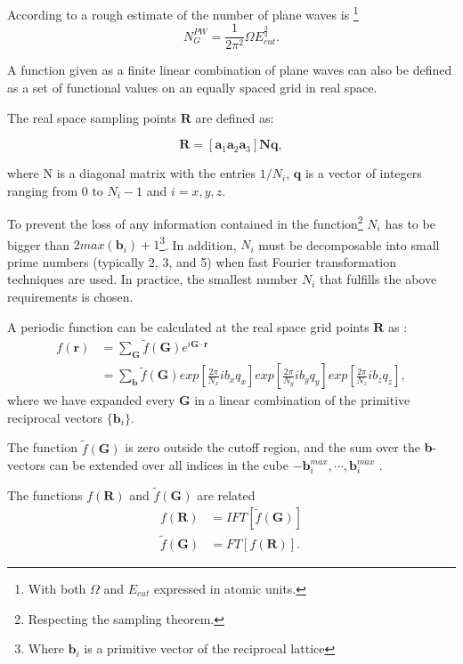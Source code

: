 \documentclass[a4paper,12pt]{article}
\newcommand\mf[1]{\mathbf{#1}}
\newcommand\erre{\mathbf{r}}
\newcommand\GI{\mathbf{G}}
\begin{document}
According to \cite[p.88]{Marx} a rough estimate of the number of plane waves is \footnote{With both $\Omega$ and $E_{cut}$ expressed in atomic units.}
\begin{equation}\label{eq:NGPW}
	N_{G}^{PW} = \frac{1}{2\pi^2}\Omega E_{cut}^{\frac{3}{2}}.
\end{equation}

A function given as a finite linear combination of plane waves can also be defined as a set of functional values on an equally spaced grid in real space.

The real space sampling points $\mf{R}$ are defined as: 

\begin{equation}
	\mf{R} = \left[\mf{a}_1 \mf{a}_2 \mf{a}_3 \right] \mf{N} \mf{q},
\end{equation}

where N is a diagonal matrix with the entries $1/N_i$, $\mf{q}$ is a vector of
integers ranging from $0$ to $N_i - 1$ and $i = x, y, z$. 

To prevent the loss of any information contained in the function\footnote{Respecting the sampling theorem.}  $N_i$ has to be bigger than $2 max(\mf{b}_i) + 1$\footnote{Where $\mf{b}_i$ is a primitive vector of the reciprocal lattice}. 
In addition, $N_i$ must be decomposable into small prime numbers (typically 2, 3, and 5) when fast Fourier transformation techniques are used.
In practice, the smallest number $N_i$ that fulfills the above requirements is
chosen.

A periodic function can be calculated at the real space grid points $\mf{R}$ as \cite[p.89]{Marx} :
\begin{align}
	f(\erre) &= \sum_{\GI} \tilde{f}(\GI) e^{i \GI \cdot \erre} \\
			 &= \sum_{\mf{b}} \tilde{f}(\GI) exp\left[ \frac{2\pi}{N_{x}} i b_x q_x \right]  exp\left[ \frac{2\pi}{N_{y}} i b_y q_y \right]  exp\left[ \frac{2\pi}{N_{z}} i b_z q_z \right], \label{eq:FFTDef}
\end{align}
where we have expanded every $\GI$ in a linear combination of the primitive reciprocal vectors $\{\mf{b}_i\}$.

The function $\tilde{f}(\GI)$ is zero outside the cutoff region, and the sum over the \textbf{b}-vectors can be extended over all indices in the cube $-\mf{b}_{i}^{max} , \cdots ,\mf{b}_{i}^{max}$ . 

The functions $f(\mf{R})$ and $\tilde{f}(\GI)$ are related
\begin{align}
	f(\mf{R}) &= IFT[ \tilde{f}(\GI) ]\\
	\tilde{f}(\GI) &= FT[ f(\mf{R}) ].
\end{align}
\end{document}
